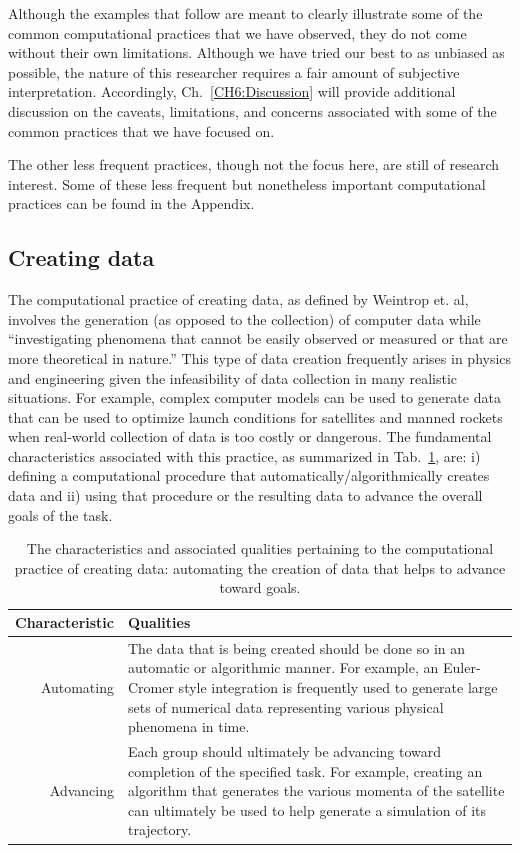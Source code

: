 \documentclass{msuphddissertation}
\begin{document}
\begin{doublespace}
Although the examples that follow are meant to clearly illustrate some of the common computational practices that we have observed, they do not come without their own limitations.  Although we have tried our best to as unbiased as possible, the nature of this researcher requires a fair amount of subjective interpretation.  Accordingly, Ch.~\ref{CH6:Discussion} will provide additional discussion on the caveats, limitations, and concerns associated with some of the common practices that we have focused on.

The other less frequent practices, though not the focus here, are still of research interest.  Some of these less frequent but nonetheless important computational practices can be found in the Appendix.

%
%
%
%
%
%
%
%
%
%
%
%
%
%
%
%

\subsection{Creating data}

The computational practice of creating data, as defined by Weintrop et. al, involves the generation (as opposed to the collection) of computer data while ``investigating phenomena that cannot be easily observed or measured or that are more theoretical in nature.''  This type of data creation frequently arises in physics and engineering given the infeasibility of data collection in many realistic situations.  For example, complex computer models can be used to generate data that can be used to optimize launch conditions for satellites and manned rockets when real-world collection of data is too costly or dangerous.  The fundamental characteristics associated with this practice, as summarized in Tab.~\ref{CH5:CreatingData}, are: i) defining a computational procedure that automatically/algorithmically creates data and ii) using that procedure or the resulting data to advance the overall goals of the task.

\begin{table}[t]
\begin{tabular}{r|p{}}
Characteristic & Qualities \\\hline\hline
Automating & The data that is being created should be done so in an automatic or algorithmic manner.  For example, an Euler-Cromer style integration is frequently used to generate large sets of numerical data representing various physical phenomena in time.\\
Advancing & Each group should ultimately be advancing toward completion of the specified task.  For example, creating an algorithm that generates the various momenta of the satellite can ultimately be used to help generate a simulation of its trajectory.\\
\end{tabular}\caption{The characteristics and associated qualities pertaining to the computational practice of creating data: automating the creation of data that helps to advance toward goals.}\label{CH5:CreatingData}
\end{table}


\end{doublespace}
\end{document}
